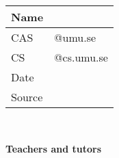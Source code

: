 \begin{titlepage}
	\thispagestyle{empty}
	\noindent {\large \MakeUppercase\university \\
				\instution \\
				\pagetypename \\
			  }

	\begin{center}
	\Large{\textbf{\titleFrontPage}}\\[7pt]

	\Large{\assignmentname}\\[40.0pt]
    
	\begin{tabular}{p{2cm}p{9.5cm}}
		\hline
		Name &  \hfill \name\\\hline
		CAS & \hfill \casuser @umu.se \\\hline
		CS & \hfill \csuser  @cs.umu.se \\\hline
		Date & \hfill \datemade\\ \hline
		Source & \hfill \small{\source}\\ \hline
	\end{tabular}\\
	
    \vfill
    
	\vfill
	\large{\textbf{Teachers and tutors\\}\graders}
	\end{center}
	\thispagestyle{empty}
\end{titlepage}
